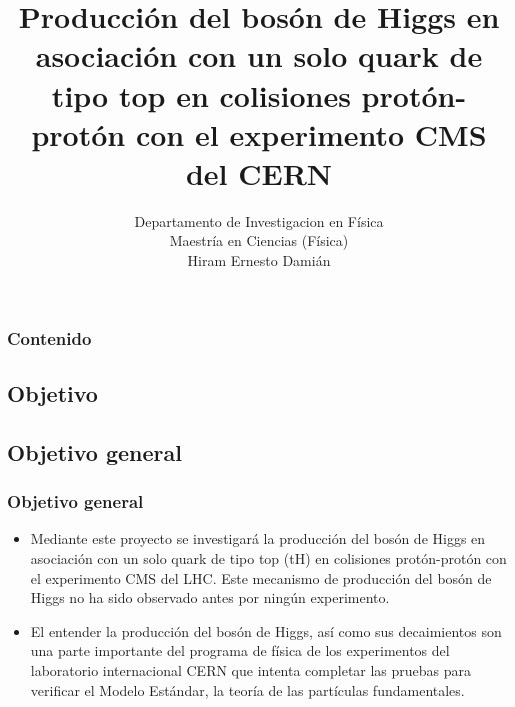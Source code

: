 \documentclass[11pt]{beamer}
\begin{document}
	\author{
		Departamento de Investigacion en F\'isica \\
		Maestría en Ciencias (Física)\\
		Hiram Ernesto Dami\'an}
	\title{Producción del bosón de Higgs en asociación con un solo quark de tipo top en colisiones protón-protón con el experimento CMS del CERN}
	\newcommand{\subf}[2]{%
		{\small\begin{tabular}[t]{@{}c@{}}
				#1\\#2
		\end{tabular}}%
	}
	\begin{frame}
	\titlepage
\end{frame}

\begin{frame}
\tableofcontents
\frametitle{Contenido}
\end{frame}

\begin{frame}
\section{Objetivo}
\subsection{Objetivo general}
\frametitle{Objetivo general}
\begin{itemize}
\item Mediante este proyecto se investigará la producción del bosón de Higgs en asociación
con un solo quark de tipo top (tH) en colisiones protón-protón con el experimento CMS
del LHC. Este mecanismo de producción del bosón de Higgs no ha sido observado antes
por ningún experimento.\\

\item El entender la producción del bosón de Higgs, así como sus
decaimientos son una parte importante del programa de física de los experimentos del
laboratorio internacional CERN que intenta completar las pruebas para verificar el
Modelo Estándar, la teoría de las partículas fundamentales.
\end{itemize}

\end{frame}
\end{document}
